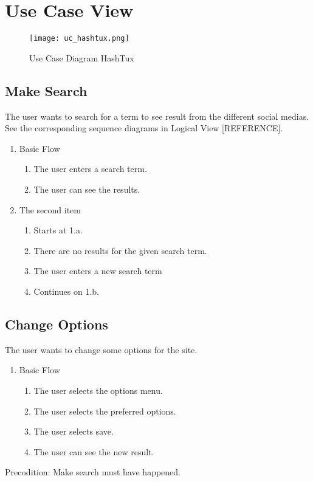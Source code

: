 \chapter{Use Case View}

\begin{figure}[ht]
  \centering
  \texttt{[image: uc\_hashtux.png]}
  \caption{Use Case Diagram HashTux}
\end{figure}

\section{Make Search}
The user wants to search for a term to see result from the different social
medias. See the corresponding sequence diagrams in Logical View [REFERENCE].
\begin{enumerate}
  \item Basic Flow
  \begin{enumerate}
    \item The user enters a search term.
    \item The user can see the results.
  \end{enumerate}
  \item The second item
  \begin{enumerate}
    \item Starts at 1.a.
    \item There are no results for the given search term.
    \item The user enters a new search term
    \item Continues on 1.b.
  \end{enumerate}
\end{enumerate}

\section{Change Options}
The user wants to change some options for the site.
\begin{enumerate}
\item Basic Flow
  \begin{enumerate}
    \item The user selects the options menu.
    \item The user selects the preferred options.
    \item The user selects save.
    \item The user can see the new result.
  \end{enumerate}
\end{enumerate}
Precodition: \newline
Make search must have happened.

